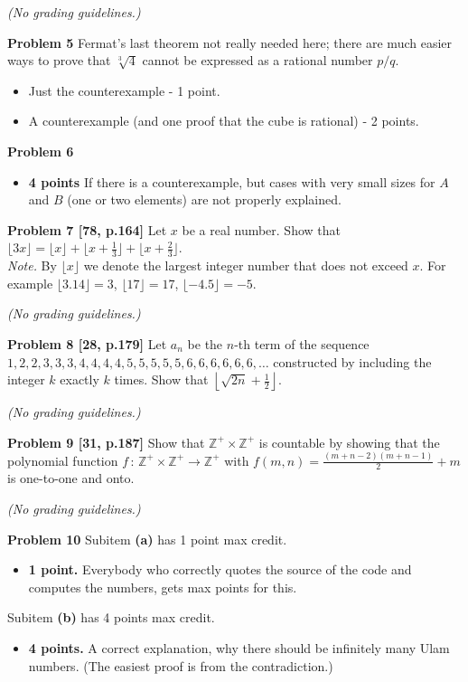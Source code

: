 \documentclass[jou]{apa6}
\begin{document}
{\em (No grading guidelines.)}


\vspace{2ex}
{\bf Problem 5} 
Fermat's last theorem not really needed here; there are much easier ways to 
prove that $\sqrt[3]{4}$ cannot be expressed as a rational number $p/q$.
\begin{itemize}
\item Just the counterexample - 1 point.
\item A counterexample (and one proof that the cube is rational) - 2 points.
\end{itemize}



\vspace{2ex}
{\bf Problem 6}
\begin{itemize}
\item {\bf 4 points} If there is a counterexample, but cases with very small sizes for $A$
and $B$ (one or two elements) are not properly explained.
\end{itemize}

\vspace{2ex}
{\footnotesize
{\bf Problem 7 [78, p.164]}
Let $x$ be a real number. Show that 
$\lfloor 3x \rfloor = \lfloor x \rfloor + \lfloor x + \frac{1}{3} \rfloor +
\lfloor x + \frac{2}{3} \rfloor$.\\
{\em Note.} By $\lfloor x \rfloor$ we denote the 
largest integer number that does not exceed $x$. 
For example $\lfloor 3.14 \rfloor = 3$, $\lfloor 17 \rfloor = 17$, 
$\lfloor -4.5 \rfloor = -5$.
}

{\em (No grading guidelines.)}

\vspace{2ex}
{\footnotesize
{\bf Problem 8 [28, p.179]}
Let $a_n$ be the $n$-th term of the sequence $1, 2,2, 3,3,3, 4,4,4,4, 5,5,5,5,5, 6,6,6,6,6,6,\ldots$
constructed by including the integer $k$ exactly $k$ times. Show that 
${\displaystyle \left\lfloor \sqrt{2n} + \frac{1}{2} \right\rfloor}$. 
}

{\em (No grading guidelines.)}

\vspace{2ex}
{\footnotesize
{\bf Problem 9 [31, p.187]}
Show that $\mathbb{Z}^{+} \times \mathbb{Z}^{+}$ is countable by showing that
the polynomial function $f\,:\,\mathbb{Z}^{+} \times \mathbb{Z}^{+} \rightarrow \mathbb{Z}^{+}$
with ${\displaystyle f(m,n) = \frac{(m+n-2)(m+n-1)}{2} + m}$ is one-to-one and onto.
}

{\em (No grading guidelines.)}

\vspace{2ex}
{\bf Problem 10}
Subitem {\bf (a)} has 1 point max credit.
\begin{itemize}
\item {\bf 1 point.} Everybody who correctly quotes the source of the code and 
computes the numbers, gets max points for this.
\end{itemize}

Subitem {\bf (b)} has 4 points max credit.
\begin{itemize}
\item {\bf 4 points.} A correct explanation, why there should be infinitely many Ulam numbers. 
(The easiest proof is from the contradiction.)
\end{itemize}
\end{document}
